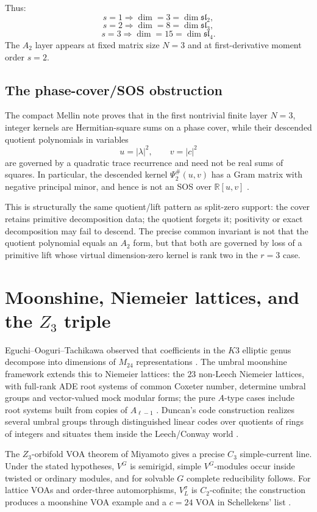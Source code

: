 \documentclass[11pt]{article}
\theoremstyle{remark}
\newcommand{\RR}{\mathbb R}
\begin{document}
Thus:
\[
        s=1\Rightarrow \dim=3=\dim\mathfrak{sl}_2,
\]
\[
        s=2\Rightarrow \dim=8=\dim\mathfrak{sl}_3,
\]
\[
        s=3\Rightarrow \dim=15=\dim\mathfrak{sl}_4.
\]
The $A_2$ layer appears at fixed matrix size $N=3$ and at first-derivative moment order $s=2$.

\subsection{The phase-cover/SOS obstruction}

The compact Mellin note proves that in the first nontrivial finite layer $N=3$, integer kernels are Hermitian-square sums on a phase cover, while their descended quotient polynomials in variables
\[
        u=|\lambda|^2,
        \qquad
        v=|c|^2
\]
are governed by a quadratic trace recurrence and need not be real sums of squares.  In particular, the descended kernel $\Psi_2^\#(u,v)$ has a Gram matrix with negative principal minor, and hence is not an SOS over $\RR[u,v]$ \cite{CompactMellinPeeling}.

This is structurally the same quotient/lift pattern as split-zero support: the cover retains primitive decomposition data; the quotient forgets it; positivity or exact decomposition may fail to descend.  The precise common invariant is not that the quotient polynomial equals an $A_2$ form, but that both are governed by loss of a primitive lift whose virtual dimension-zero kernel is rank two in the $r=3$ case.

\section{Moonshine, Niemeier lattices, and the $Z_3$ triple}

Eguchi--Ooguri--Tachikawa observed that coefficients in the $K3$ elliptic genus decompose into dimensions of $M_{24}$ representations \cite{EguchiOoguriTachikawa}.  The umbral moonshine framework extends this to Niemeier lattices: the $23$ non-Leech Niemeier lattices, with full-rank ADE root systems of common Coxeter number, determine umbral groups and vector-valued mock modular forms; the pure $A$-type cases include root systems built from copies of $A_{\ell-1}$ \cite{ChengDuncanHarvey}.  Duncan's code construction realizes several umbral groups through distinguished linear codes over quotients of rings of integers and situates them inside the Leech/Conway world \cite{DuncanCodes}.

The $Z_3$-orbifold VOA theorem of Miyamoto gives a precise $C_3$ simple-current line.  Under the stated hypotheses, $V^G$ is semirigid, simple $V^G$-modules occur inside twisted or ordinary modules, and for solvable $G$ complete reducibility follows.  For lattice VOAs and order-three automorphisms, $V_L^\sigma$ is $C_2$-cofinite; the construction produces a moonshine VOA example and a $c=24$ VOA in Schellekens' list \cite{MiyamotoZ3}.
\end{document}
